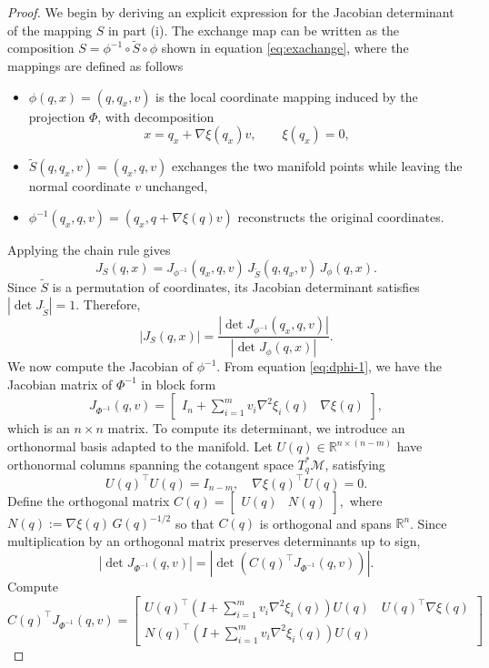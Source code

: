 \documentclass[10pt,a4paper]{amsart}
\begin{document}
\begin{proof}
We begin by deriving an explicit expression for the Jacobian determinant of the mapping $S$ in part (i). The exchange map can be written as the composition
\(
S = \phi^{-1} \circ \tilde S \circ \phi
\)
shown in equation \eqref{eq:exachange}, where the mappings are defined as follows
\begin{itemize}
\item $\phi(q,x) = (q,q_x,v)$ is the local coordinate mapping induced by the projection $\Phi$, with decomposition
\[
x = q_x + \nabla\xi(q_x)v,\qquad \xi(q_x)=0,
\]
\item $\tilde S(q,q_x,v) = (q_x,q,v)$ exchanges the two manifold points while leaving the normal coordinate $v$ unchanged,
\item $\phi^{-1}(q_x,q,v) = (q_x, q + \nabla\xi(q)v)$ reconstructs the original coordinates.
\end{itemize}
Applying the chain rule gives
\[
J_S(q,x)
=
J_{\phi^{-1}}(q_x,q,v)\,
J_{\tilde S}(q,q_x,v)\,
J_{\phi}(q,x).
\]
Since $\tilde S$ is a permutation of coordinates, its Jacobian determinant satisfies
\(
|\det J_{\tilde S}| = 1.
\)
Therefore,
\[
|J_S(q,x)|
=
\frac{
\left|\det J_{\phi^{-1}}(q_x,q,v)\right|
}{
\left|\det J_{\phi}(q,x)\right|
}.
\]
We now compute the Jacobian of $\phi^{-1}$. From equation \eqref{eq:dphi-1}, we have the Jacobian matrix of $\Phi^{-1}$ in block form
\[
J_{\Phi^{-1}}(q,v)
=
\begin{bmatrix}
I_n + \sum_{i=1}^m v_i \nabla^2\xi_i(q)
&
\nabla\xi(q)
\end{bmatrix},
\]
which is an $n\times n$ matrix.
To compute its determinant, we introduce an orthonormal basis adapted to the manifold. Let
\(
U(q)\in\mathbb R^{n\times (n-m)}
\)
have orthonormal columns spanning the cotangent space $T_q^*\mathcal M$, satisfying
\[
U(q)^\top U(q) = I_{n-m},\quad
\nabla\xi(q)^\top U(q) = 0.
\]
Define the orthogonal matrix
\(
C(q)
=
\begin{bmatrix}
U(q) & N(q)
\end{bmatrix},
\)
where $N(q) := \nabla\xi(q)\, G(q)^{-1/2}$ so that $C(q)$ is orthogonal and spans $\mathbb R^n$.
Since multiplication by an orthogonal matrix preserves determinants up to sign,
\[
|\det J_{\Phi^{-1}}(q,v)|
=
|\det(C(q)^\top J_{\Phi^{-1}}(q,v))|.
\]
Compute
\[
C(q)^\top J_{\Phi^{-1}}(q,v)
=
\begin{bmatrix}
U(q)^\top \left(I + \sum_{i=1}^m v_i \nabla^2\xi_i(q)\right) U(q)
&
U(q)^\top \nabla\xi(q)
\\
N(q)^\top \left(I + \sum_{i=1}^m v_i \nabla^2\xi_i(q)\right) U(q)

\end{bmatrix}\]
\end{proof}
\end{document}
